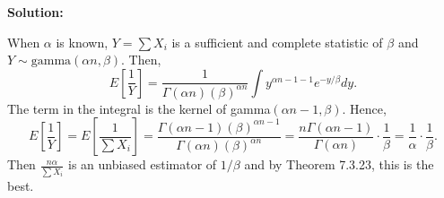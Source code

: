 \documentclass[11pt]{article}
\newcommand{\Sol}{\par {\bf Solution:}}
\begin{document}
\Sol

When $\alpha$ is known, $Y = \sum X_i$ is a sufficient and complete statistic of $\beta$ and $Y \sim \text{gamma}(\alpha n, \beta)$.
Then,
\[
E[\frac{1}{Y}] = \frac{1}{\Gamma(\alpha n){(\beta)}^{\alpha n}} \int y^{\alpha n - 1 - 1}e^{-y/\beta} dy.
\]
The term in the integral is the kernel of gamma$(\alpha n - 1, \beta)$. Hence,
\[
E[\frac{1}{Y}] = E[\frac{1}{\sum X_i}] = \frac{\Gamma(\alpha n - 1){(\beta)}^{\alpha n - 1}}{\Gamma(\alpha n){(\beta)}^{\alpha n }} = \frac{n\Gamma(\alpha n - 1)}{\Gamma(\alpha n)} \cdot \frac{1}{\beta} = \frac{1}{\alpha} \cdot \frac{1}{\beta}.
\]
Then $\frac{n\alpha}{\sum X_i}$ is an unbiased estimator of $1/\beta$ and by Theorem 7.3.23, this is the best.
\end{document}
